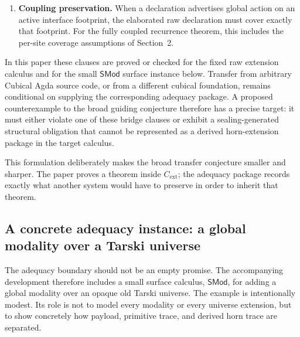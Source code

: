 \begin{remark}
\begin{enumerate}
\item \textbf{Coupling preservation.}  When a declaration advertises global action on an
active interface footprint, the elaborated raw declaration must cover exactly that footprint.
For the fully coupled recurrence theorem, this includes the per-site coverage assumptions of
Section~2.
\end{enumerate}

In this paper these clauses are proved or checked for the fixed raw extension calculus and
for the small \(\mathsf{SMod}\) surface instance below.  Transfer from arbitrary Cubical Agda
source code, or from a different cubical foundation, remains conditional on supplying the
corresponding adequacy package.  A proposed counterexample to the broad guiding conjecture
therefore has a precise target: it must either violate one of these bridge clauses or exhibit a
sealing-generated structural obligation that cannot be represented as a derived horn-extension
package in the target calculus.
\end{remark}

This formulation deliberately makes the broad transfer conjecture smaller and sharper.  The
paper proves a theorem inside \(C_{\mathrm{ext}}\); the adequacy package records exactly what
another system would have to preserve in order to inherit that theorem.

\subsection{A concrete adequacy instance: a global modality over a Tarski universe}

The adequacy boundary should not be an empty promise.  The accompanying development
therefore includes a small surface calculus, \(\mathsf{SMod}\), for adding a global modality
over an opaque old Tarski universe.  The example is intentionally modest.  Its role is not to
model every modality or every universe extension, but to show concretely how payload,
primitive trace, and derived horn trace are separated.

